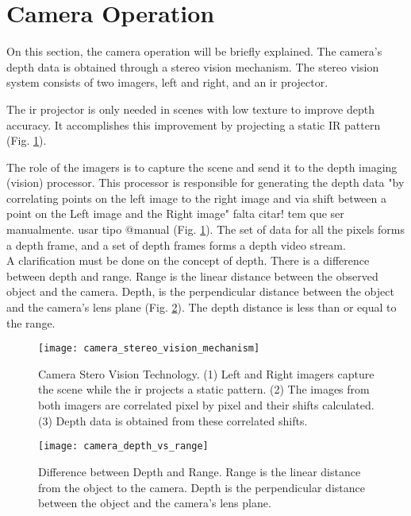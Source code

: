 

\section{Camera Operation}
\label{sec:vision_system_camera_operation}

On this section, the camera operation will be briefly explained. The camera's depth data is obtained through a stereo vision mechanism. The stereo vision system consists of two imagers, left and right, and an \gls{ir} projector. 

The \gls{ir} projector is only needed in scenes with low texture to improve depth accuracy. It accomplishes this improvement by projecting a static IR pattern (Fig. \ref{fig:camera_stereo_vision_mechanism}).

The role of the imagers is to capture the scene and send it to the depth imaging (vision) processor. This processor is responsible for generating the depth data "by correlating points on the left image to the right image and via shift between a point on the Left image and the Right image" \cite{} {\color{red} falta citar! tem que ser manualmente. usar tipo @manual} (Fig. \ref{fig:camera_stereo_vision_mechanism}). The set of data for all the pixels forms a depth frame, and a set of depth frames forms a depth video stream.\\

A clarification must be done on the concept of depth. There is a difference between depth and range. Range is the linear distance between the observed object and the camera. Depth, is the perpendicular distance between the object and the camera's lens plane (Fig. \ref{fig:camera_depth_vs_range}). The depth distance is less than or equal to the range.

\begin{figure}[htbp]
	\centering
	\texttt{[image: camera\_stereo\_vision\_mechanism]}
	\caption{Camera Stero Vision Technology. (1) Left and Right imagers capture the scene while the \gls{ir} projects a static pattern. (2) The images from both imagers are correlated pixel by pixel and their shifts calculated. (3) Depth data is obtained from these correlated shifts.}  
	\label{fig:camera_stereo_vision_mechanism}
\end{figure}

\begin{figure}[htbp]
	\centering
	\texttt{[image: camera\_depth\_vs\_range]}
	\caption{Difference between Depth and Range. Range is the linear distance from the object to the camera. Depth is the perpendicular distance between the object and the camera's lens plane.}
	\label{fig:camera_depth_vs_range}
\end{figure}

